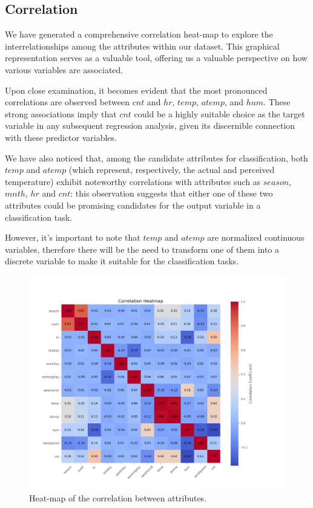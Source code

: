 \documentclass[11pt,a4paper]{article}
\begin{document}
\subsection{Correlation}

We have generated a comprehensive correlation heat-map to explore the interrelationships among the attributes within our dataset. This graphical representation serves as a valuable tool, offering us a valuable perspective on how various variables are associated.

Upon close examination, it becomes evident that the most pronounced correlations are observed between $cnt$ and $hr$, $temp$, $atemp$, and $hum$. These strong associations imply that $cnt$ could be a highly suitable choice as the target variable in any subsequent regression analysis, given its discernible connection with these predictor variables. 

We have also noticed that, among the candidate attributes for classification, both $temp$ and $atemp$ (which represent, respectively, the actual and perceived temperature) exhibit noteworthy correlations with attributes such as $season$, $mnth$, $hr$ and $cnt$: this observation suggests that either one of these two attributes could be promising candidates for the output variable in a classification task.

However, it's important to note that $temp$ and $atemp$ are normalized continuous variables, therefore there will be the need to transform one of them into a discrete variable to make it suitable for the classification tasks.


\begin{figure}[H]
    \centering
    \includegraphics[width=0.9\linewidth]{res/plots/correlation_heatmap.png}
    \caption{Heat-map of the correlation between attributes.}
    \label{fig:correlation_heatmap}
\end{figure}
\end{document}
